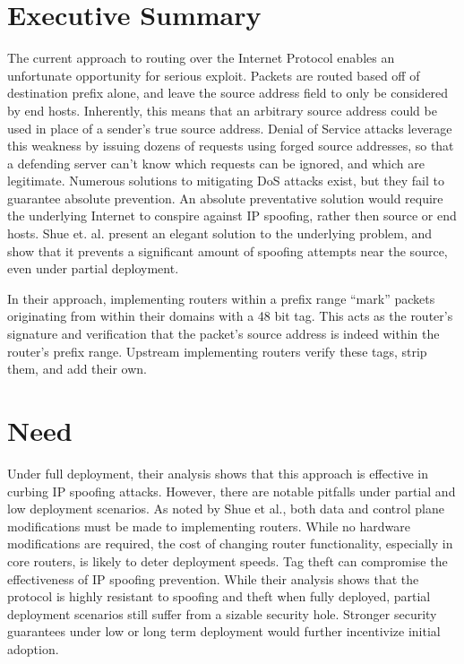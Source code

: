 \documentclass[12pt]{article} %
\begin{document}

\newpage %



\section{Executive Summary}
	The current approach to routing over the Internet Protocol enables an unfortunate opportunity for serious exploit. Packets are routed based off of destination prefix alone, and leave the source address field to only be considered by end hosts. Inherently, this means that an arbitrary source address could be used in place of a sender's true source address. Denial of Service attacks leverage this weakness by issuing dozens of requests using forged source addresses, so that a defending server can't know which requests can be ignored, and which are legitimate. Numerous solutions to mitigating DoS attacks exist, but they fail to guarantee absolute prevention. An absolute preventative solution would require the underlying Internet to conspire against IP spoofing, rather then source or end hosts. Shue et. al. present an elegant solution to the underlying problem, and show that it prevents a significant amount of spoofing attempts near the source, even under partial deployment\cite{Shue20081567}.

	In their approach, implementing routers within a prefix range ``mark'' packets originating from within their domains with a 48 bit tag. This acts as the router's signature and verification that the packet's source address is indeed within the router's prefix range. Upstream implementing routers verify these tags, strip them, and add their own.

\section{Need}
	Under full deployment, their analysis shows that this approach is effective in curbing IP spoofing attacks. However, there are notable pitfalls under partial and low deployment scenarios. As noted by Shue et al., both data and control plane modifications must be made to implementing routers. While no hardware modifications are required, the cost of changing router functionality, especially in core routers, is likely to deter deployment speeds. Tag theft can compromise the effectiveness of IP spoofing prevention. While their analysis shows that the protocol is highly resistant to spoofing and theft when fully deployed, partial deployment scenarios still suffer from a sizable security hole. Stronger security guarantees under low or long term deployment would further incentivize initial adoption. 
\end{document}
